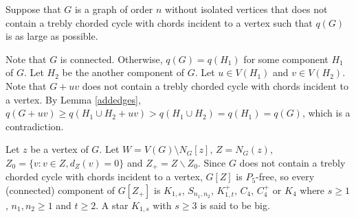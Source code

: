 \documentclass[12pt]{article}
\begin{document}
Suppose that $G$ is a graph of order $n$ without isolated vertices that does not contain a trebly chorded cycle with chords incident to a vertex such that $q(G)$ is as large as possible.

Note that  $G$ is connected. Otherwise,   $q(G)=q(H_1)$ for some component $H_1$ of $G$.
Let $H_2$ be the another component of $G$. Let $u\in V(H_1)$ and $v\in V(H_2)$.
Note that $G+uv$ does not contain a trebly chorded cycle with chords incident to a vertex.
By Lemma \ref{addedges}, $q(G+uv)\ge q(H_1\cup H_2+uv)>q(H_1\cup H_2)=q(H_1)=q(G)$,
which is a contradiction.

Let $z$ be a vertex of $G$. Let $W=V(G)\setminus N_G[z]$, $Z=N_G(z)$, $Z_0=\{v:v\in Z,d_Z(v)=0\}$ and $Z_+=Z\backslash Z_0$.
Since $G$ does not contain a trebly chorded cycle with chords incident to a vertex,
$G[Z]$ is $P_5$-free, so every (connected) component of $G[Z_+]$ is $K_{1,s}$, $S_{n_1,n_2}$, $K_{1,t}^+$, $C_4$, $C_4^+$ or $K_4$ where $s\ge 1$, $n_1,n_2\ge 1$ and $t\ge 2$.
A star $K_{1,s}$ with $s\ge 3$  is said to be  big.
\end{document}
